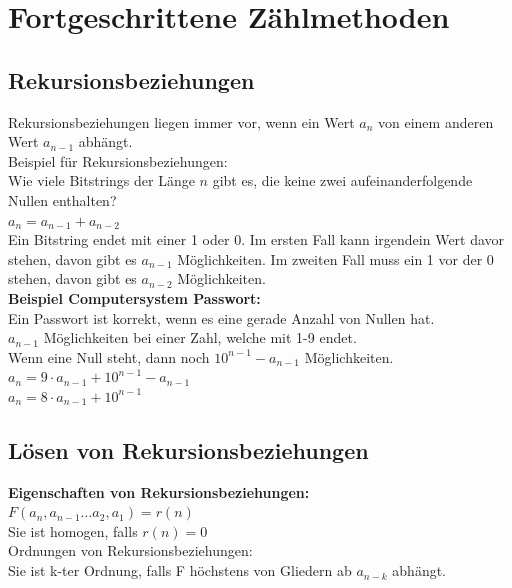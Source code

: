 \documentclass[12pt]{scrartcl}
\begin{document}
\section{Fortgeschrittene Zählmethoden}
\subsection{Rekursionsbeziehungen}
Rekursionsbeziehungen liegen immer vor, wenn ein Wert $a_n$ von einem anderen Wert $a_{n-1}$ abhängt.\\
Beispiel für Rekursionsbeziehungen:\\
Wie viele Bitstrings der Länge $n$ gibt es, die keine zwei aufeinanderfolgende
Nullen enthalten?\\

$a_n = a_{n-1} + a_{n-2}$\\

Ein Bitstring endet mit einer 1 oder 0. Im ersten Fall kann irgendein Wert davor stehen, davon
gibt es $a_{n-1}$ Möglichkeiten. Im zweiten Fall muss ein 1 vor der 0 stehen, davon gibt es $a_{n-2}$ Möglichkeiten.\\


\textbf{Beispiel Computersystem Passwort:}\\
Ein Passwort ist korrekt, wenn es eine gerade Anzahl von Nullen hat.\\

$a_{n-1}$ Möglichkeiten bei einer Zahl, welche mit 1-9 endet.\\
Wenn eine Null steht, dann noch $10^{n-1} - a_{n-1}$ Möglichkeiten.\\

$a_n = 9 \cdot a_{n-1} + 10^{n-1} - a_{n-1}$\\
$a_n = 8 \cdot a_{n-1} + 10^{n-1}$\\


\subsection{Lösen von Rekursionsbeziehungen}
\textbf{Eigenschaften von Rekursionsbeziehungen:}\\
$F(a_n, a_{n-1} \dots a_2, a_1) = r(n)$\\

Sie ist homogen, falls $r(n) = 0$\\

Ordnungen von Rekursionsbeziehungen:\\
Sie ist k-ter Ordnung, falls F höchstens von Gliedern ab $a_{n-k}$ abhängt.
\end{document}
